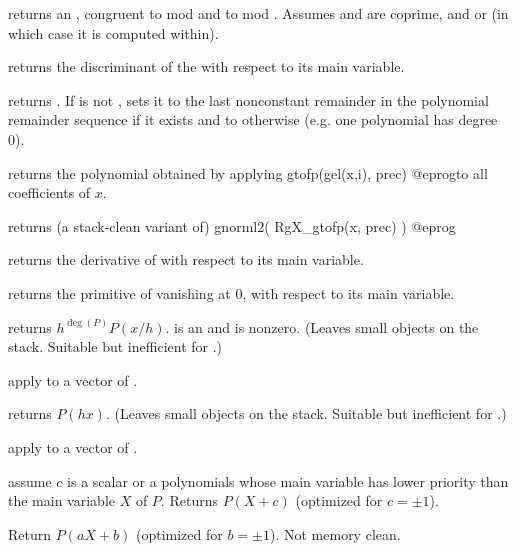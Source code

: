 returns an , congruent to  mod  and to  mod
. Assumes  and  are coprime, and 
or  (in which case it is computed within).

 returns the discriminant of the  
with respect to its main variable.

 returns
. If  is not , sets it to the last
nonconstant remainder in the polynomial remainder sequence if it exists and to
 otherwise (e.g. one polynomial has degree 0).


 returns the polynomial obtained by
applying
\bprog
  gtofp(gel(x,i), prec)
@eprog\noindent to all coefficients of $x$.

 returns (a stack-clean variant of)
\bprog
  gnorml2( RgX_gtofp(x, prec) )
@eprog

 returns the derivative of  with respect to
its main variable.

 returns the primitive of  vanishing at
$0$, with respect to its main variable.

 returns $h^{\deg(P)} P(x/h)$.
 is an  and  is nonzero. (Leaves small objects on the
stack. Suitable but inefficient for .)

 apply  to a vector
of .

 returns $P(h x)$. (Leaves small objects
on the stack. Suitable but inefficient for .)

 apply  to a vector
of .

 assume $c$ is a scalar or
a polynomials whose main variable has lower priority than the main variable
$X$ of $P$. Returns $P(X + c)$ (optimized for $c = \pm 1$).

 Return $P(aX + b)$
(optimized for $b = \pm 1$). Not memory clean.


